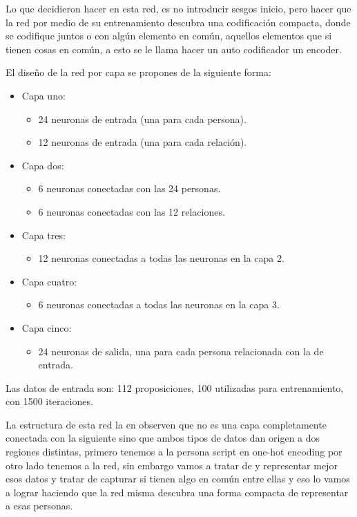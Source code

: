 Lo que decidieron hacer en esta red, es no introducir sesgos inicio, pero hacer que la red por medio de su entrenamiento descubra una codificación compacta, donde se codifique juntos o con algún elemento en común, aquellos elementos que si tienen cosas en común, a esto se le llama hacer un auto codificador un encoder. 

El diseño de la red por capa se propones de la siguiente forma:

\begin{itemize}
 \item Capa uno:
 \begin{itemize}
  \item 24 neuronas de entrada (una para cada persona).
  \item 12 neuronas de entrada (una para cada relación).
 \end{itemize}
\item Capa dos:
 \begin{itemize}
  \item 6 neuronas conectadas con las 24 personas.
  \item 6 neuronas conectadas con las 12 relaciones.
 \end{itemize}
\item Capa tres:
 \begin{itemize}
  \item 12 neuronas conectadas a todas las neuronas en la capa 2.
 \end{itemize}
\item Capa cuatro:
 \begin{itemize}
  \item 6 neuronas conectadas a todas las neuronas en la capa 3.
 \end{itemize}
\item Capa cinco:
 \begin{itemize}
  \item 24 neuronas de salida, una para cada persona relacionada con la de entrada.
 \end{itemize}

\end{itemize}

Las datos de entrada son: 112 proposiciones, 100 utilizadas para entrenamiento, con 1500 iteraciones.

 La estructura de esta red la  en observen que no es una capa completamente conectada con la siguiente sino que ambos tipos de datos dan origen a dos regiones distintas, primero tenemos a la persona script en one-hot encoding por otro lado tenemos a la red, sin embargo vamos a tratar de y representar mejor esos datos y tratar de capturar si tienen algo en común entre ellas y eso lo vamos a lograr haciendo que la red misma descubra una forma compacta de representar a esas personas. 

